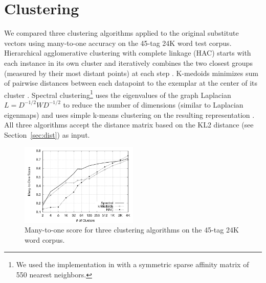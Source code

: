 \section{Clustering}
\label{sec:clustering}

We compared three clustering algorithms applied to the original
substitute vectors using many-to-one accuracy on the 45-tag 24K word
test corpus.  Hierarchical agglomerative clustering with complete
linkage (HAC) starts with each instance in its own cluster and
iteratively combines the two closest groups (measured by their most
distant points) at each step \cite{manning2008introduction}.
K-medoids minimizes sum of pairwise distances between each datapoint
to the exemplar at the center of its cluster
\cite{kaufman2005finding}.  Spectral clustering\footnote{We used the
  implementation in \cite{chen2011parallel} with a symmetric sparse
  affinity matrix of 550 nearest neighbors.} uses the eigenvalues of
the graph Laplacian $L=D^{-1/2} W D^{-1/2}$ to reduce the number of
dimensions (similar to Laplacian eigenmaps) and uses simple k-means
clustering on the resulting representation \cite{ng2002spectral}.  All
three algorithms accept the distance matrix based on the KL2 distance
(see Section~\ref{sec:dist}) as input.

\begin{figure}[h] \centering
\includegraphics[width=0.5\textwidth]{clustering_graph_mono.png}
\caption{Many-to-one score for three clustering algorithms on the
  45-tag 24K word corpus.}
\label{fig:clustering}
\end{figure}



